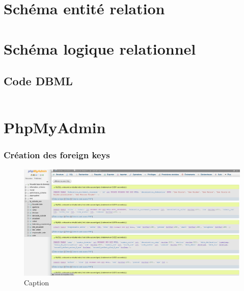 \section{Schéma entité relation}

\section{Schéma logique relationnel}
\subsection{Code DBML}
\inputminted[breaklines =true, autogobble, linenos, frame = single]{sql}{Codes/code_dbml.tex}


\section{PhpMyAdmin}
\subsubsection{Création des foreign keys}
\begin{figure}[H]
    \centering
    \includegraphics[width=15cm]{Appendix/phpmyadmin_creation_table.png}
    \caption{Caption}
    \label{fig:pmy_creation_fk}
\end{figure}